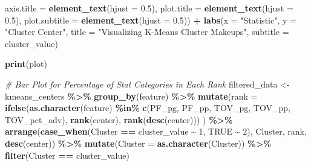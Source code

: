 \documentclass[
]{article}
\newenvironment{Shaded}{\begin{snugshade}}{\end{snugshade}}
\newcommand{\AttributeTok}[1]{\textcolor[rgb]{0.13,0.29,0.53}{#1}}
\newcommand{\CommentTok}[1]{\textcolor[rgb]{0.56,0.35,0.01}{\textit{#1}}}
\newcommand{\ConstantTok}[1]{\textcolor[rgb]{0.56,0.35,0.01}{#1}}
\newcommand{\DecValTok}[1]{\textcolor[rgb]{0.00,0.00,0.81}{#1}}
\newcommand{\FloatTok}[1]{\textcolor[rgb]{0.00,0.00,0.81}{#1}}
\newcommand{\FunctionTok}[1]{\textcolor[rgb]{0.13,0.29,0.53}{\textbf{#1}}}
\newcommand{\NormalTok}[1]{#1}
\newcommand{\OtherTok}[1]{\textcolor[rgb]{0.56,0.35,0.01}{#1}}
\newcommand{\SpecialCharTok}[1]{\textcolor[rgb]{0.81,0.36,0.00}{\textbf{#1}}}
\newcommand{\StringTok}[1]{\textcolor[rgb]{0.31,0.60,0.02}{#1}}
\begin{document}
\begin{Shaded}
\begin{Highlighting}[]
          \AttributeTok{axis.title =} \FunctionTok{element\_text}\NormalTok{(}\AttributeTok{hjust =} \FloatTok{0.5}\NormalTok{),}
          \AttributeTok{plot.title =} \FunctionTok{element\_text}\NormalTok{(}\AttributeTok{hjust =} \FloatTok{0.5}\NormalTok{),}
          \AttributeTok{plot.subtitle =} \FunctionTok{element\_text}\NormalTok{(}\AttributeTok{hjust =} \FloatTok{0.5}\NormalTok{)) }\SpecialCharTok{+}
    \FunctionTok{labs}\NormalTok{(}\AttributeTok{x =} \StringTok{"Statistic"}\NormalTok{, }\AttributeTok{y =} \StringTok{"Cluster Center"}\NormalTok{,}
         \AttributeTok{title =} \StringTok{"Visualizing K{-}Means Cluster Makeups"}\NormalTok{,}
         \AttributeTok{subtitle =}\NormalTok{ cluster\_value)}
  
  \FunctionTok{print}\NormalTok{(plot)}
  
  
  \CommentTok{\# Bar Plot for Percentage of Stat Categories in Each Rank}
\NormalTok{  filtered\_data }\OtherTok{\textless{}{-}}\NormalTok{ kmeans\_centers }\SpecialCharTok{\%\textgreater{}\%}
    \FunctionTok{group\_by}\NormalTok{(feature) }\SpecialCharTok{\%\textgreater{}\%}
    \FunctionTok{mutate}\NormalTok{(}\AttributeTok{rank =} \FunctionTok{ifelse}\NormalTok{(}\FunctionTok{as.character}\NormalTok{(feature) }\SpecialCharTok{\%in\%} \FunctionTok{c}\NormalTok{(}\StringTok{\textquotesingle{}PF\_pg\textquotesingle{}}\NormalTok{, }\StringTok{\textquotesingle{}PF\_pp\textquotesingle{}}\NormalTok{, }\StringTok{\textquotesingle{}TOV\_pg\textquotesingle{}}\NormalTok{, }\StringTok{\textquotesingle{}TOV\_pp\textquotesingle{}}\NormalTok{, }\StringTok{\textquotesingle{}TOV\_pct\_adv\textquotesingle{}}\NormalTok{), }
                         \FunctionTok{rank}\NormalTok{(center), }
                         \FunctionTok{rank}\NormalTok{(}\FunctionTok{desc}\NormalTok{(center)))}
\NormalTok{    ) }\SpecialCharTok{\%\textgreater{}\%}
    \FunctionTok{arrange}\NormalTok{(}\FunctionTok{case\_when}\NormalTok{(Cluster }\SpecialCharTok{==}\NormalTok{ cluster\_value }\SpecialCharTok{\textasciitilde{}} \DecValTok{1}\NormalTok{, }\ConstantTok{TRUE} \SpecialCharTok{\textasciitilde{}} \DecValTok{2}\NormalTok{), Cluster, rank, }\FunctionTok{desc}\NormalTok{(center)) }\SpecialCharTok{\%\textgreater{}\%}
    \FunctionTok{mutate}\NormalTok{(}\AttributeTok{Cluster =} \FunctionTok{as.character}\NormalTok{(Cluster)) }\SpecialCharTok{\%\textgreater{}\%}
    \FunctionTok{filter}\NormalTok{(Cluster }\SpecialCharTok{==}\NormalTok{ cluster\_value)}
  

\end{Highlighting}
\end{Shaded}
\end{document}
